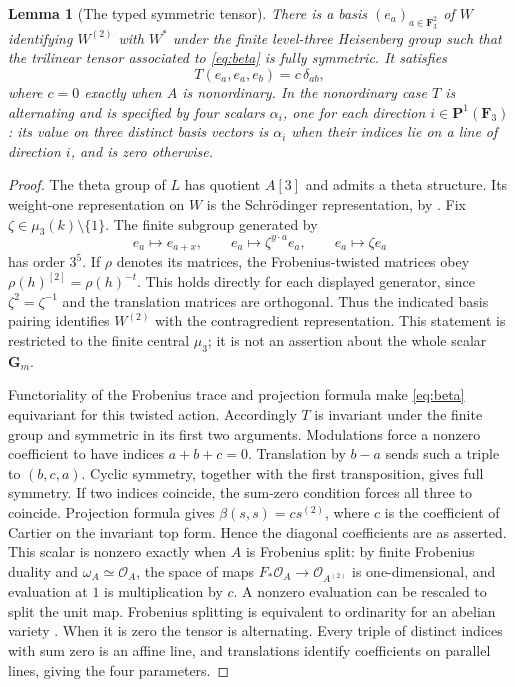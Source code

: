 \documentclass[11pt]{article}
\newtheorem{lemma}[theorem]{Lemma}
\theoremstyle{definition}\newtheorem{definition}[theorem]{Definition}
\theoremstyle{remark}\newtheorem{remark}[theorem]{Remark}
\newcommand{\OO}{\mathcal O}
\newcommand{\PP}{\mathbf P}
\newcommand{\FF}{\mathbf F}
\begin{document}
\begin{lemma}[The typed symmetric tensor]\label{lem:tensor}
There is a basis $(e_a)_{a\in\FF_3^2}$ of $W$ identifying $W^{(2)}$ with $W^*$ under the finite level-three Heisenberg group such that the trilinear tensor associated to \eqref{eq:beta} is fully symmetric. It satisfies
\[
 T(e_a,e_a,e_b)=c\,\delta_{ab},
\]
where $c=0$ exactly when $A$ is nonordinary. In the nonordinary case $T$ is alternating and is specified by four scalars $\alpha_i$, one for each direction $i\in\PP^1(\FF_3)$: its value on three distinct basis vectors is $\alpha_i$ when their indices lie on a line of direction $i$, and is zero otherwise.
\end{lemma}
\begin{proof}
The theta group of $L$ has quotient $A[3]$ and admits a theta structure. Its weight-one representation on $W$ is the Schr\"odinger representation, by \citet[Lemma~8.24, p.~121; Theorem~8.28 and description~8.29, pp.~122--123; Corollary~9.17, pp.~133--134]{EGM}. Fix $\zeta\in\mu_3(k)\setminus\{1\}$. The finite subgroup generated by
\[
 e_a\longmapsto e_{a+x},\qquad
 e_a\longmapsto\zeta^{y\cdot a}e_a,\qquad
 e_a\longmapsto\zeta e_a
\]
has order $3^5$. If $\rho$ denotes its matrices, the Frobenius-twisted matrices obey $\rho(h)^{[2]}=\rho(h)^{-t}$. This holds directly for each displayed generator, since $\zeta^2=\zeta^{-1}$ and the translation matrices are orthogonal. Thus the indicated basis pairing identifies $W^{(2)}$ with the contragredient representation. This statement is restricted to the finite central $\mu_3$; it is not an assertion about the whole scalar $\mathbf G_m$.

Functoriality of the Frobenius trace and projection formula make \eqref{eq:beta} equivariant for this twisted action. Accordingly $T$ is invariant under the finite group and symmetric in its first two arguments. Modulations force a nonzero coefficient to have indices $a+b+c=0$. Translation by $b-a$ sends such a triple to $(b,c,a)$. Cyclic symmetry, together with the first transposition, gives full symmetry. If two indices coincide, the sum-zero condition forces all three to coincide. Projection formula gives $\beta(s,s)=c s^{(2)}$, where $c$ is the coefficient of Cartier on the invariant top form. Hence the diagonal coefficients are as asserted. This scalar is nonzero exactly when $A$ is Frobenius split: by finite Frobenius duality and $\omega_A\simeq\OO_A$, the space of maps $F_*\OO_A\to\OO_{A^{(2)}}$ is one-dimensional, and evaluation at $1$ is multiplication by $c$. A nonzero evaluation can be rescaled to split the unit map. Frobenius splitting is equivalent to ordinarity for an abelian variety \citep[Definition--Proposition~2.1, p.~1071]{SannaiTanaka}. When it is zero the tensor is alternating. Every triple of distinct indices with sum zero is an affine line, and translations identify coefficients on parallel lines, giving the four parameters.
\end{proof}
\end{document}
